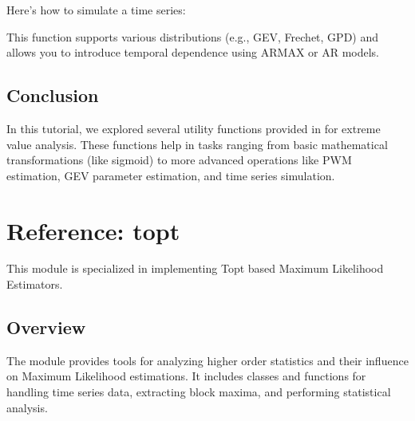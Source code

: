 \documentclass[a4paper,11pt,openany,english]{sphinxmanual}
\begin{document}
\sphinxAtStartPar
Here’s how to simulate a time series:

\begin{sphinxVerbatim}[commandchars=\\\{\}]
   

     \PYG{p}{[}\PYG{p}{]} 

\PYG{p}{[}\PYG{p}{]}
\end{sphinxVerbatim}

\sphinxAtStartPar
This function supports various distributions (e.g., GEV, Frechet, GPD) and allows you to introduce temporal dependence using ARMAX or AR models.


\section{Conclusion}
\label{\detokenize{miscellaneous:conclusion}}
\sphinxAtStartPar
In this tutorial, we explored several utility functions provided in  for extreme value analysis. These functions help in tasks ranging from basic mathematical transformations (like sigmoid) to more advanced operations like PWM estimation, GEV parameter estimation, and time series simulation.

\sphinxstepscope


\chapter{Reference: topt}
\label{\detokenize{api_topt:reference-topt}}\label{\detokenize{api_topt::doc}}
\sphinxAtStartPar
This module is specialized in implementing Top\sphinxhyphen{}t based Maximum Likelihood Estimators.


\section{Overview}
\label{\detokenize{api_topt:overview}}
\sphinxAtStartPar
The  module provides tools for analyzing higher order statistics and their influence on Maximum Likelihood estimations. It includes classes and functions for handling time series data, extracting block maxima, and performing statistical analysis.
\end{document}
